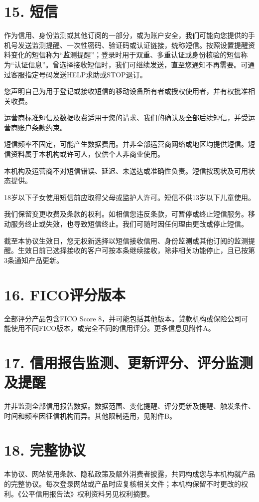 \documentclass[UTF8,fontset=none,11pt,a4paper]{ctexart}
\begin{document}
\section*{15. 短信}
作为信用、身份监测或其他订阅的一部分，或为账户安全，我们可能向您提供的手机号发送监测提醒、一次性密码、验证码或认证链接，统称短信。按照设置提醒资料变化的短信称为“监测提醒”；登录时用于双重、多重认证或身份核验的短信称为“认证信息”。曾选择接收短信时，我们可继续发送，直至您通知不再需要。可通过客服指定号码发送HELP求助或STOP退订。


您声明自己为用于登记或接收短信的移动设备所有者或授权使用者，并有权批准相关收费。


运营商标准短信及数据收费适用于您的请求、我们的确认及全部后续短信，并受运营商账户条款约束。


短信频率不固定，可能产生数据费用。并非全部运营商网络或地区均提供短信。短信资料属于本机构或许可人，仅供个人非商业使用。


本机构及运营商不对短信错误、延迟、未送达或准确性负责。短信按现状及可用状态提供。


18岁以下子女使用短信前应取得父母或监护人许可。短信不供13岁以下儿童使用。


我们保留变更收费及条款的权利。如相信您违反条款，可暂停或终止短信服务。移动服务终止或失效，也导致短信终止。我们可随时因任何理由更改或停止短信。


截至本协议生效日，您无权新选择以短信接收信用、身份监测或其他订阅的监测提醒。生效日前已选择接收的客户可按本条继续接收，除非相关功能停止，且已按第3条通知产品更新。


\section*{16. FICO评分版本}
全部评分产品包含FICO Score 8，并可能包括其他版本。贷款机构或保险公司可能使用不同FICO版本，或完全不同的信用评分。更多信息见附件A。


\section*{17. 信用报告监测、更新评分、评分监测及提醒}
并非监测全部信用报告数据。数据范围、变化提醒、评分更新及提醒、触发条件、时间和频率因征信机构而异。其他限制适用，见附件B。


\section*{18. 完整协议}
本协议、网站使用条款、隐私政策及额外消费者披露，共同构成您与本机构就产品的完整协议。每次登录网站或产品时应复核相关文件；本机构保留不时更改的权利。《公平信用报告法》权利资料另见权利摘要。
\end{document}
